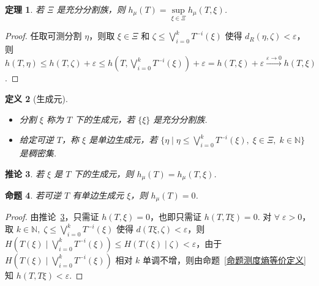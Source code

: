 \documentclass[11pt, a4paper, oneside]{ctexart}
\newtheorem{theorem}{定理}[section]
\newtheorem{corollary}[theorem]{推论}
\newtheorem{definition}[theorem]{定义}
\newtheorem{proposition}[theorem]{命题}
\newcommand{\N}{\mathbb{N}}
\begin{document}
    \begin{theorem}
        若 $\Xi$ 是充分分割族，则 $h_{\mu}(T)=\sup\limits_{\xi\in\Xi}h_{\mu}(T,\xi)$.
    \end{theorem}
    \begin{proof}
        任取可测分割 $\eta$，则取 $\xi\in\Xi$ 和 $\zeta\leq \bigvee\limits_{i=0}^{k}T^{-i}(\xi)$ 使得 $d_R(\eta,\zeta)<\varepsilon$，则 $h(T,\eta)\leq h(T,\zeta)+\varepsilon\leq h(T,\bigvee\limits_{i=0}^{k}T^{-i}(\xi))+\varepsilon=h(T,\xi)+\varepsilon\stackrel{\varepsilon\to 0}{\longrightarrow}h(T,\xi)$.
    \end{proof}

    \begin{definition}[生成元]
        \begin{itemize}
            \item 分割 $\xi$ 称为 $T$ 下的生成元，若 $\{\xi\}$ 是充分分割族.
            \item 给定可逆 $T$，称 $\xi$ 是单边生成元，若 $\{\eta\mid \eta\leq \bigvee\limits_{i=0}^{k}T^{-i}(\xi),\; \xi\in\Xi,\; k\in\N\}$ 是稠密集.
        \end{itemize}
    \end{definition}
    \begin{corollary}\label{推论生成元}
        若 $\xi$ 是 $T$ 下的生成元，则 $h_{\mu}(T)=h_{\mu}(T,\xi)$.
    \end{corollary}
    \begin{proposition}
        若可逆 $T$ 有单边生成元 $\xi$，则 $h_{\mu}(T)=0$.
    \end{proposition}
    \begin{proof}
        由推论~\ref{推论生成元}，只需证 $h(T,\xi)=0$，也即只需证 $h(T,T\xi)=0$. 对 $\forall\; \varepsilon>0$，取 $k\in\N,\; \zeta\leq \bigvee\limits_{i=0}^{k}T^{-i}(\xi)$ 使得 $d(T\xi,\zeta)<\varepsilon$，则 $H(T(\xi)\mid \bigvee\limits_{i=0}^{k}T^{-i}(\xi))\leq H(T(\xi)\mid \zeta)<\varepsilon$，由于 $H(T(\xi)\mid \bigvee\limits_{i=0}^{k}T^{-i}(\xi))$ 相对 $k$ 单调不增，则由命题~\ref{命题测度熵等价定义} 知 $h(T,T\xi)<\varepsilon$.
    \end{proof}
\end{document}
